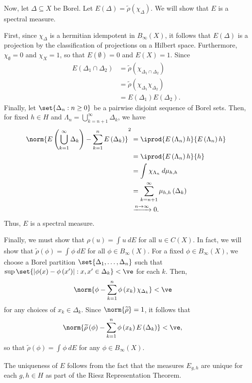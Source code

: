 \documentclass[10pt]{mypackage}
\begin{document}
\begin{theorem}
  Now, let $\Delta\subseteq X$ be Borel. Let $E\left( \Delta \right) = \widetilde{\rho}\left( \chi_{\Delta} \right)$. We will show that $E$ is a spectral measure.

  First, since $ \chi_{\Delta} $ is a hermitian idempotent in $B_{\infty}(X)$, it follows that $E\left( \Delta \right)$ is a projection by the classification of projections on a Hilbert space. Furthermore, $\chi_{\emptyset} = 0$ and $\chi_{X} = 1$, so that $E\left( \emptyset \right) = 0$ and $E\left( X \right) = 1$. Since
  \begin{align*}
    E\left( \Delta_1\cap \Delta_2 \right) &= \widetilde{\rho}\left( \chi_{\Delta_1\cap \Delta_2} \right)\\
                                          &= \widetilde{\rho}\left( \chi_{\Delta_1}\chi_{\Delta_2} \right)\\
                                          &= E\left( \Delta_1 \right)E\left( \Delta_2 \right).
  \end{align*}
  Finally, let $\set{\Delta_n : n\geq 0}$ be a pairwise disjoint sequence of Borel sets. Then, for fixed $h\in H$ and $\Lambda_n = \bigcup_{k=n+1}^{\infty}\Delta_k$, we have
  \begin{align*}
    \norm{E\left( \bigcup_{k=1}^{\infty}\Delta_k \right) - \sum_{k=1}^{n}E\left( \Delta_k \right)}^2 &= \iprod{E\left( \Lambda_n \right)h}{E\left( \Lambda_n \right)h}\\
               &= \iprod{E\left( \Lambda_n \right)h}{h}\\
               &= \int_{}^{} \chi_{\Lambda_n}\:d\mu_{h,h}\\
               &= \sum_{k=n+1}^{\infty}\mu_{h,h}\left( \Delta_k \right)\\
               &\xrightarrow{n\rightarrow\infty} 0.
  \end{align*}
  Thus, $E$ is a spectral measure.

  Finally, we must show that $\rho\left( u \right) = \int_{}^{} u\:dE$ for all $u\in C(X)$. In fact, we will show that $ \widetilde{\rho} \left( \phi \right) = \int_{}^{} \phi\:dE$ for all $\phi\in B_{\infty}(X)$. For a fixed $\phi\in B_{\infty}(X)$, we choose a Borel partition $\set{\Delta_1,\dots,\Delta_n}$ such that $\sup\set{\left\vert \phi(x) - \phi\left( x' \right) \right\vert : x,x'\in \Delta_k} < \ve$ for each $k$. Then,
  \begin{align*}
    \norm{\phi - \sum_{k=1}^{n}\phi\left( x_k \right)\chi_{\Delta_k}} &< \ve
  \end{align*}
  for any choices of $x_{k}\in \Delta_k$. Since $ \norm{\widetilde{\rho}} = 1 $, it follows that
  \begin{align*}
    \norm{ \widetilde{\rho}\left( \phi \right) - \sum_{k=1}^{n}\phi\left( x_k \right)E\left( \Delta_k \right) } &< \ve,
  \end{align*}
  so that $ \widetilde{\rho}\left( \phi \right) = \int_{}^{} \phi\:dE $ for any $\phi\in B_{\infty}\left( X \right)$.

  The uniqueness of $E$ follows from the fact that the measures $E_{g,h}$ are unique for each $g,h\in H$ as part of the Riesz Representation Theorem.
\end{theorem}
\end{document}
